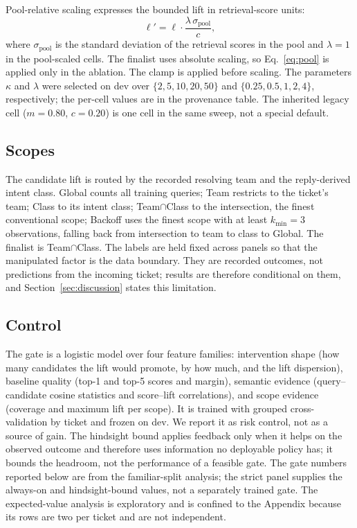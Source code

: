 Pool-relative scaling expresses the bounded lift in retrieval-score units:
\begin{equation}
\ell'=\ell\cdot\frac{\lambda\,\sigma_{\mathrm{pool}}}{c},
\label{eq:pool}
\end{equation}
where $\sigma_{\mathrm{pool}}$ is the standard deviation of the retrieval scores in
the pool and $\lambda=1$ in the pool-scaled cells. The finalist uses absolute
scaling, so Eq.~\ref{eq:pool} is applied only in the ablation. The clamp is applied
before scaling. The parameters $\kappa$ and $\lambda$ were selected on dev over
$\{2,5,10,20,50\}$ and $\{0.25,0.5,1,2,4\}$, respectively; the per-cell values are
in the provenance table. The inherited legacy cell ($m=0.80$, $c=0.20$) is one
cell in the same sweep, not a special default.

\subsection{Scopes}
The candidate lift is routed by the recorded resolving team and the reply-derived
intent class. Global counts all training queries; Team restricts to the ticket's
team; Class to its intent class; Team$\cap$Class to the intersection, the finest
conventional scope; Backoff uses the finest scope with at least $k_{\min}=3$
observations, falling back from intersection to team to class to Global. The
finalist is Team$\cap$Class. The labels are held fixed across panels so that the
manipulated factor is the data boundary. They are recorded outcomes, not
predictions from the incoming ticket; results are therefore conditional on them,
and Section~\ref{sec:discussion} states this limitation.

\subsection{Control}
The gate is a logistic model over four feature families: intervention shape (how
many candidates the lift would promote, by how much, and the lift dispersion),
baseline quality (top-1 and top-5 scores and margin), semantic evidence
(query--candidate cosine statistics and score--lift correlations), and scope
evidence (coverage and maximum lift per scope). It is trained with grouped
cross-validation by ticket and frozen on dev. We report it as risk
control, not as a source of gain. The hindsight bound applies feedback only when it
helps on the observed outcome and therefore uses information no deployable policy
has; it bounds the headroom, not the performance of a feasible gate. The gate
numbers reported below are from the familiar-split analysis; the
strict panel supplies the always-on and hindsight-bound values, not a separately
trained gate. The expected-value analysis is exploratory and is confined to the
Appendix because its rows are two per ticket and are not independent.

